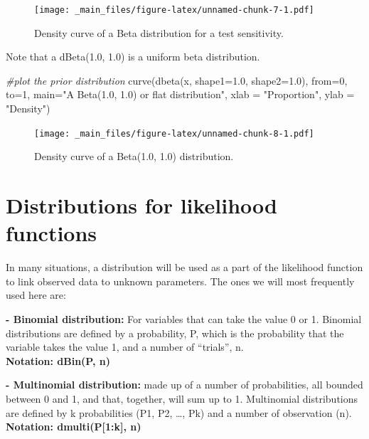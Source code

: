 \documentclass[
]{book}
\newenvironment{Shaded}{\begin{snugshade}}{\end{snugshade}}
\newcommand{\AttributeTok}[1]{\textcolor[rgb]{0.77,0.63,0.00}{#1}}
\newcommand{\CommentTok}[1]{\textcolor[rgb]{0.56,0.35,0.01}{\textit{#1}}}
\newcommand{\DecValTok}[1]{\textcolor[rgb]{0.00,0.00,0.81}{#1}}
\newcommand{\FloatTok}[1]{\textcolor[rgb]{0.00,0.00,0.81}{#1}}
\newcommand{\FunctionTok}[1]{\textcolor[rgb]{0.00,0.00,0.00}{#1}}
\newcommand{\NormalTok}[1]{#1}
\newcommand{\StringTok}[1]{\textcolor[rgb]{0.31,0.60,0.02}{#1}}
\begin{document}
\begin{figure}
\centering
\texttt{[image: \_main\_files/figure-latex/unnamed-chunk-7-1.pdf]}
\caption{Density curve of a Beta distribution for a test sensitivity.}
\end{figure}

Note that a dBeta(1.0, 1.0) is a uniform beta distribution.

\begin{Shaded}
\begin{Highlighting}[]
\CommentTok{\#plot the prior distribution}
\FunctionTok{curve}\NormalTok{(}\FunctionTok{dbeta}\NormalTok{(x, }\AttributeTok{shape1=}\FloatTok{1.0}\NormalTok{, }\AttributeTok{shape2=}\FloatTok{1.0}\NormalTok{), }\AttributeTok{from=}\DecValTok{0}\NormalTok{, }\AttributeTok{to=}\DecValTok{1}\NormalTok{, }
      \AttributeTok{main=}\StringTok{"A Beta(1.0, 1.0) or flat distribution"}\NormalTok{, }\AttributeTok{xlab =} \StringTok{"Proportion"}\NormalTok{, }\AttributeTok{ylab =} \StringTok{"Density"}\NormalTok{)}
\end{Highlighting}
\end{Shaded}

\begin{figure}
\centering
\texttt{[image: \_main\_files/figure-latex/unnamed-chunk-8-1.pdf]}
\caption{Density curve of a Beta(1.0, 1.0) distribution.}
\end{figure}

\hypertarget{distributions-for-likelihood-functions}{%
\section{Distributions for likelihood
functions}\label{distributions-for-likelihood-functions}}

In many situations, a distribution will be used as a part of the
likelihood function to link observed data to unknown parameters. The
ones we will most frequently used here are:

\textbf{- Binomial distribution:} For variables that can take the value
0 or 1. Binomial distributions are defined by a probability, P, which is
the probability that the variable takes the value 1, and a number of
``trials'', n.\\
\textbf{Notation: dBin(P, n)}

\textbf{- Multinomial distribution:} made up of a number of
probabilities, all bounded between 0 and 1, and that, together, will sum
up to 1. Multinomial distributions are defined by k probabilities (P1,
P2, \ldots, Pk) and a number of observation (n).\\
\textbf{Notation: dmulti(P{[}1:k{]}, n)}
\end{document}
